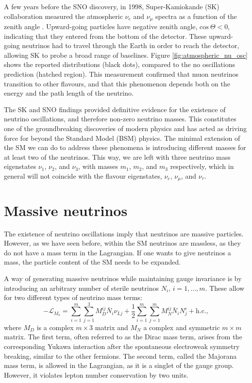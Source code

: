 A few years before the SNO discovery, in 1998, Super-Kamiokande (SK) collaboration measured the atmospheric $\nu_{e}$ and $\nu_{\mu}$ spectra as a function of the zenith angle \cite{SuperKamiokande1998}. Upward-going particles have negative zenith angle, $\mathrm{cos}~\Theta < 0$, indicating that they entered from the bottom of the detector. These upward-going neutrinos had to travel through the Earth in order to reach the detector, allowing SK to probe a broad range of baselines. Figure \ref{fig:atmospheric_nu_osc} shows the reported distributions (black dots), compared to the no oscillations prediction (hatched region). This measurement confirmed that muon neutrinos transition to other flavours, and that this phenomenon depends both on the energy and the path length of the neutrino.

The SK and SNO findings provided definitive evidence for the existence of neutrino oscillations, and therefore non-zero neutrino masses. This constitutes one of the groundbreaking discoveries of modern physics and has acted as driving force for beyond the Standard Model (BSM) physics. The minimal extension of the SM we can do to address these phenomena is introducing different masses for at least two of the neutrinos. This way, we are left with three neutrino mass eigenstates $\nu_{1}$, $\nu_{2}$, and $\nu_{3}$, with masses $m_{1}$, $m_{2}$, and $m_{3}$ respectively, which in general will not coincide with the flavour eigenstates, $\nu_{e}$, $\nu_{\mu}$, and $\nu_{\tau}$.

\section{Massive neutrinos}\label{sec:nu_mass}

The existence of neutrino oscillations imply that neutrinos are massive particles. However, as we have seen before, within the SM neutrinos are massless, as they do not have a mass term in the Lagrangian. If one wants to give neutrinos a mass, the particle content of the SM needs to be expanded.

A way of generating massive neutrinos while maintaining gauge invariance is by introducing an arbitrary number of sterile neutrinos $N_{i}$, $i=1,\dots,m$. These allow for two different types of neutrino mass terms:
\begin{equation}\label{2.10}
	-\mathcal{L}_{M_{\nu}} = \sum_{i=1}^{m} \sum_{j=1}^{3} M^{ij}_{D} \bar{N}_{i} \nu_{Lj} + \frac{1}{2} \sum_{i=1}^{m} \sum_{j=1}^{m} M^{ij}_{N} \bar{N}_{i} N^{c}_{j} + \mathrm{h.c.},
\end{equation}
where $M_{D}$ is a complex $m \times 3$ matrix and $M_{N}$ a complex and symmetric $m \times m$ matrix. The first term, often referred to as the Dirac mass term, arises from the corresponding Yukawa interaction after the spontaneous electroweak symmetry breaking, similar to the other fermions. The second term, called the Majorana mass term, is allowed in the Lagrangian, as it is a singlet of the gauge group. However, it violates lepton number conservation by two units.

